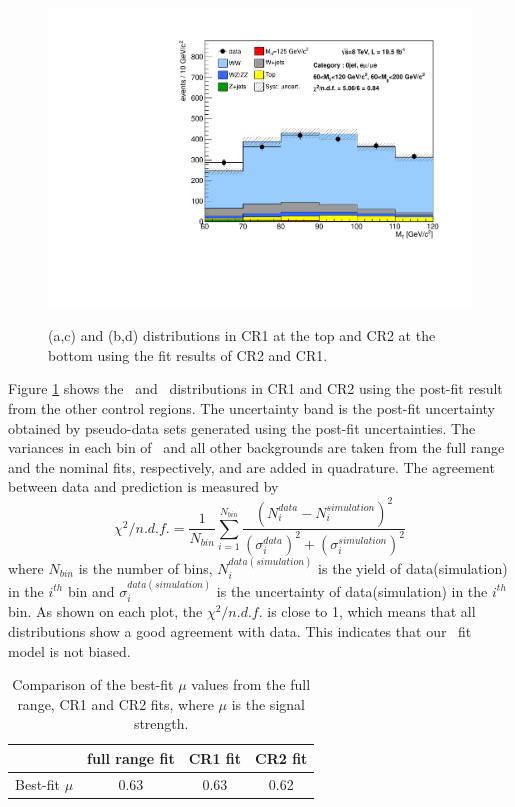 \begin{figure}[!hbtp]
{\includegraphics[width=.47\textwidth]{figures/mT_CR2.pdf}
}\\
\caption{\mll(a,c) and \mT(b,d) distributions in CR1 at the top and CR2
at the bottom using the fit results of CR2 and CR1.}
\label{fig:wwctl_final}
\end{figure}

Figure \ref{fig:wwctl_final} shows the \mT\ and \mll\ distributions in CR1 and CR2 using 
the post-fit result from the other control regions. 
The uncertainty band is the post-fit uncertainty obtained by pseudo-data sets 
generated using the post-fit uncertainties. 
The variances in each bin of \qqww\ and all other backgrounds 
are taken from the full range and the nominal fits, respectively, 
and are added in quadrature. 
The agreement between data and prediction is measured by
\begin{equation} 
\chi^2/n.d.f.
= \frac{1}{N_{bin}} \displaystyle \sum_{i=1}^{N_{bin}}  
  \frac{\left( N^{data}_i - N^{simulation}_i \right)^2}
       {\left( \sigma^{data}_i \right)^2 + \left( \sigma^{simulation}_i \right)^2}   
\end{equation}  
where $N_{bin}$ is the number of bins, 
$N^{data(simulation)}_i$ is the yield of data(simulation) in the $i^{th}$ bin
and $\sigma^{data(simulation)}_i$ is the uncertainty of data(simulation) 
in the $i^{th}$ bin. As shown on each plot, the $\chi^2/n.d.f.$
is close to 1, which means that all distributions show a good agreement with data.
This indicates that our \qqww\ fit model is not biased.

%
\begin{table}
\begin{center}
\vspace{0.5cm} 
\caption{Comparison of the best-fit $\mu$ values from the full range, CR1 and CR2 fits, 
where $\mu$ is the signal strength.} 
\vspace{0.5cm} 
\begin{tabular}{c|ccc}
\hline
                    & full range fit    & CR1 fit   & CR2 fit   \\
\hline \hline
Best-fit $\mu$      & 0.63              & 0.63      & 0.62      \\
\hline
\end{tabular}
\label{tab:bestfitmu_compare}
\end{center}
\end{table}

